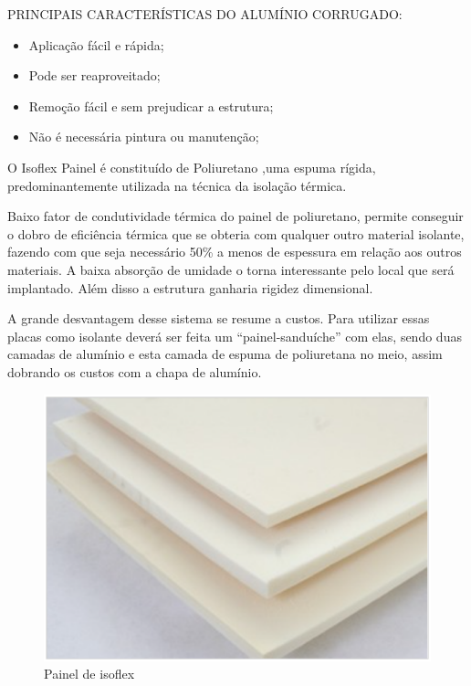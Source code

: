 PRINCIPAIS CARACTERÍSTICAS DO ALUMÍNIO CORRUGADO\cite{isar}:
\begin{itemize}
  \item Aplicação fácil e rápida;
  \item Pode ser reaproveitado;
  \item Remoção fácil e sem prejudicar a estrutura;
  \item Não é necessária pintura ou manutenção;
\end{itemize}


O Isoflex Painel é constituído de Poliuretano ,uma espuma rígida, predominantemente utilizada na técnica da isolação térmica.\cite{isar}

Baixo fator de condutividade térmica do painel de poliuretano, permite conseguir o dobro de eficiência térmica que se obteria com qualquer outro material isolante, fazendo com que seja necessário 50\% a menos de espessura em relação aos outros materiais. A baixa absorção de umidade o torna interessante pelo local que será implantado. Além disso a estrutura ganharia rigidez dimensional.\cite{isar}

A grande desvantagem desse sistema se resume a custos. Para utilizar essas placas como isolante deverá ser feita um “painel-sanduíche” com elas, sendo duas camadas de alumínio e esta camada de espuma de poliuretana no meio, assim dobrando os custos com a chapa de alumínio.\cite{isar}

\begin{figure}[H]
 \centering
   \includegraphics[keepaspectratio=true,scale=0.8]{figuras/isoflex.eps}
 \caption{Painel de isoflex}
 \label{isoflex}
\end{figure}

